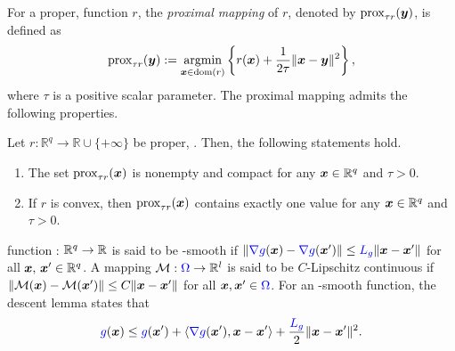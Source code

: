 For a proper,  function $r$, the \textit{proximal mapping} of $r$, denoted by $\operatorname{prox}_{\tau r}(\bm{y})$, is defined as
\begin{align}
    \operatorname{prox}_{\tau r}(\bm{y}) := \operatorname*{\mathrm{argmin}}\limits_{\bm{x} \in \operatorname{dom}(r)}\left\{ r(\bm{x}) + \frac{1}{2\tau}\|\bm{x} - \bm{y}\|^{2}\right\}, \notag
\end{align}
where $\tau$ is a positive scalar parameter. The proximal mapping admits the following
properties.
\begin{proposition}\label{prop:rockafellar}
\textnormal{\cite{Rockafellar1998VariationalA}}
    Let $r : \mathbb{R}^{q}\rightarrow \mathbb{R}\cup \{+\infty\}$ be proper, . Then, the following {statements hold}.
    \begin{enumerate}[label=(\roman*)]
        \item The set $\operatorname{prox}_{\tau r}(\bm{x})$ is nonempty and compact
            for any $\bm{x} \in \mathbb{R}^{q}$ and $\tau > 0$.

        \item If $r$ is convex, then $\operatorname{prox}_{\tau r}(\bm{x})$
            contains exactly one value for any $\bm{x} \in \mathbb{R}^{q}$ and
            $\tau > 0$.
    \end{enumerate}
\end{proposition}

 function : $\mathbb{R}^q \rightarrow \mathbb{R}$ is said to be -smooth if $\| {\color{blue}\nabla g}(\bm{x}) - {\color{blue}\nabla g}(\bm{x}') \| \leq {\color{blue}L_g} \| \bm{x} - \bm{x}'\|$ for all $\bm{x},\, \bm{x}' \in \mathbb{R}^q$.
A mapping $\mathcal{M} : {\color{blue}\Omega} \to \mathbb{R}^l$ is said to be $C$-Lipschitz continuous if $\|\mathcal{M}(\bm{x}) - \mathcal{M}(\bm{x}')\| \leq C\|\bm{x} - \bm{x}'\|$ for all $\bm{x}, \bm{x}' \in {\color{blue}\Omega}$. For an -smooth function, the descent lemma  states that
\begin{align}
\label{Eq: the descent lemma}
    \blue{g}(\bx) \leq \blue{g}(\bx') + \langle \blue{\nabla g}(\bx'), \bx - \bx' \rangle + \frac{\blue{L_g}}{2} \| \bx - \bx'\|^2.
\end{align}

